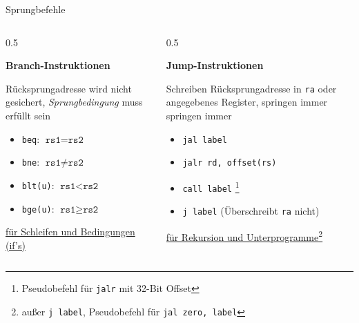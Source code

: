 \begin{frame}[c, fragile]{Sprungbefehle}{}
	\vspace{-0.5cm}
	\begin{columns}
		\begin{column}{0.5\textwidth}
			\begin{center}\textbf{Branch-Instruktionen}\end{center}
			Rücksprungadresse wird nicht gesichert, \emph{Sprungbedingung}
			muss erfüllt sein
			\vspace{0.5\baselineskip}
			\begin{itemize}
				\item \verb|beq|: $\texttt{rs1} = \texttt{rs2}$
				\item \verb|bne|: $\texttt{rs1} \ne \texttt{rs2}$
				\item \verb|blt(u)|: $\texttt{rs1} < \texttt{rs2}$
				\item \verb|bge(u)|: $\texttt{rs1} \ge \texttt{rs2}$
			\end{itemize}
			\begin{center}
				\underline{für Schleifen und Bedingungen (if's)}
			\end{center}
		\end{column}
		\begin{column}{0.5\textwidth}
			\begin{center}\textbf{Jump-Instruktionen}\end{center}
			Schreiben Rücksprungadresse in \texttt{ra} oder angegebenes Register,
			springen immer
			springen immer
			\vspace{0.5\baselineskip}
			\begin{itemize}
				\item \verb|jal label|
				\item \verb|jalr rd, offset(rs)|
				\item \verb|call label| \footnote[frame]{Pseudobefehl für \texttt{jalr} mit 32-Bit Offset}
				\item \verb|j label| (Überschreibt \texttt{ra} nicht)
			\end{itemize}
			\begin{center}
				\underline{für Rekursion und Unterprogramme\footnote[frame]{außer \texttt{j label}, Pseudobefehl für \texttt{jal zero, label}}}
			\end{center}
		\end{column}
	\end{columns}
\end{frame}

